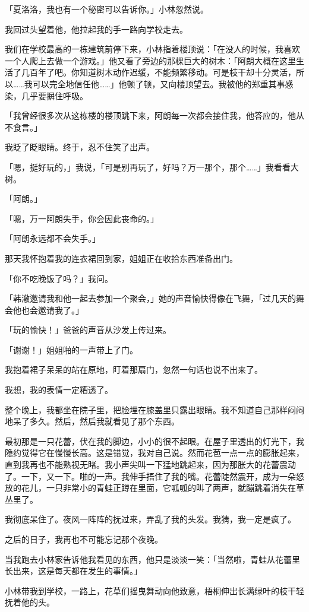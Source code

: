 \documentclass[UTF8]{ctexart}
\begin{document}
「夏洛洛，我也有一个秘密可以告诉你。」小林忽然说。

我回过头望着他，他拉起我的手一路向学校走去。

我们在学校最高的一栋建筑前停下来，小林指着楼顶说：「在没人的时候，我喜欢一个人爬上去做一个游戏。」他又看了旁边的那棵巨大的树木：「阿朗大概在这里生活了几百年了吧。你知道树木动作迟缓，不能频繁移动。可是枝干却十分灵活，所以……我可以完全地信任他……」他顿了顿，又向楼顶望去。我被他的郑重其事感染，几乎要摒住呼吸。

「我曾经很多次从这栋楼的楼顶跳下来，阿朗每一次都会接住我，他答应的，他从不食言。」

我眨了眨眼睛。终于，忍不住笑了出声。

「嗯，挺好玩的，」我说，「可是别再玩了，好吗？万一那个，那个……」我看看大树。

「阿朗。」

「嗯，万一阿朗失手，你会因此丧命的。」

「阿朗永远都不会失手。」

 那天我怀抱着我的连衣裙回到家，姐姐正在收拾东西准备出门。

「你不吃晚饭了吗？」我问。

「韩澈邀请我和他一起去参加一个聚会，」她的声音愉快得像在飞舞，「过几天的舞会他也会邀请我了。」

「玩的愉快！」爸爸的声音从沙发上传过来。

「谢谢！」姐姐啪的一声带上了门。

我抱着裙子呆呆的站在原地，盯着那扇门，忽然一句话也说不出来了。

我想，我的表情一定糟透了。

整个晚上，我都坐在院子里，把脸埋在膝盖里只露出眼睛。我不知道自己那样闷闷地呆了多久。然后，然后我就看见了那个东西。

最初那是一只花蕾，伏在我的脚边，小小的很不起眼。在屋子里透出的灯光下，我隐约觉得它在慢慢长高。这是错觉，我对自己说。然而花苞一点一点的膨胀起来，直到我再也不能熟视无睹。我小声尖叫一下猛地跳起来，因为那胀大的花蕾震动了。一下，又一下。啪的一声。我伸手捂住了我的嘴。花蕾陡然震开，成为一朵怒放的花儿，一只非常小的青蛙正蹲在里面，它呱呱的叫了两声，就蹦跳着消失在草丛里了。

我彻底呆住了。夜风一阵阵的抚过来，弄乱了我的头发。我猜，我一定是疯了。

之后的日子，我再也不可能忘记那个夜晚。

当我跑去小林家告诉他我看见的东西，他只是淡淡一笑：「当然啦，青蛙从花蕾里长出来，这是每天都在发生的事情。」

小林带我到学校，一路上，花草们摇曳舞动向他致意，梧桐伸出长满绿叶的枝干轻抚着他的头。
\end{document}
